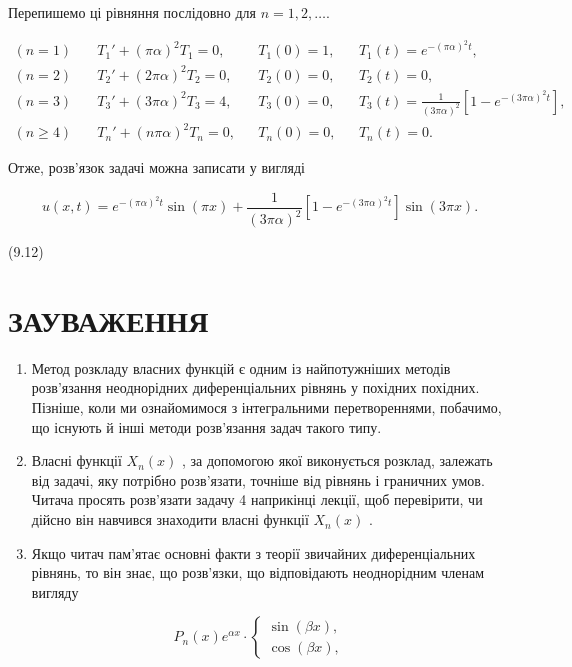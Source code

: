 \documentclass[
  ukrainian,
]{article}
\begin{document}
Перепишемо ці рівняння послідовно для \(n=1,2,\dots\).

\[
\begin{aligned}
(n=1)\quad & T_1' + (\pi\alpha)^2 T_1 = 0, && T_1(0) = 1, && T_1(t) = e^{-(\pi\alpha)^2 t}, \\
(n=2)\quad & T_2' + (2\pi\alpha)^2 T_2 = 0, && T_2(0) = 0, && T_2(t) = 0, \\
(n=3)\quad & T_3' + (3\pi\alpha)^2 T_3 = 4, && T_3(0) = 0, && T_3(t) = \frac{1}{(3\pi\alpha)^2}\left[1 - e^{-(3\pi\alpha)^2 t}\right], \\
(n\geqslant 4)\quad & T_n' + (n\pi\alpha)^2 T_n = 0, && T_n(0) = 0, && T_n(t) = 0.
\end{aligned}
\]

Отже, розв'язок задачі можна записати у вигляді

\[
u(x, t) = e^{-(\pi\alpha)^2 t} \sin(\pi x) + \frac{1}{(3\pi\alpha)^2} [1 - e^{-(3\pi\alpha)^2 t}] \sin(3\pi x).
\]

(9.12)

\section{ЗАУВАЖЕННЯ}\label{ux437ux430ux443ux432ux430ux436ux435ux43dux43dux44f-6}

\begin{enumerate}
\def\labelenumi{\arabic{enumi}.}
\item
  Метод розкладу власних функцій є одним із найпотужніших методів
  розв'язання неоднорідних диференціальних рівнянь у похідних похідних.
  Пізніше, коли ми ознайомимося з інтегральними перетвореннями,
  побачимо, що існують й інші методи розв'язання задач такого типу.
\item
  Власні функції \(X_n(x)\) , за допомогою якої виконується розклад,
  залежать від задачі, яку потрібно розв'язати, точніше від рівнянь і
  граничних умов. Читача просять розв'язати задачу 4 наприкінці лекції,
  щоб перевірити, чи дійсно він навчився знаходити власні функції
  \(X_n(x)\) .
\item
  Якщо читач пам'ятає основні факти з теорії звичайних диференціальних
  рівнянь, то він знає, що розв'язки, що відповідають неоднорідним
  членам вигляду
\end{enumerate}

\[
P_n(x) e^{\alpha x} \cdot
\begin{cases} \sin{(\beta x)}, \\ \cos{(\beta x)}, \end{cases}
\]
\end{document}
